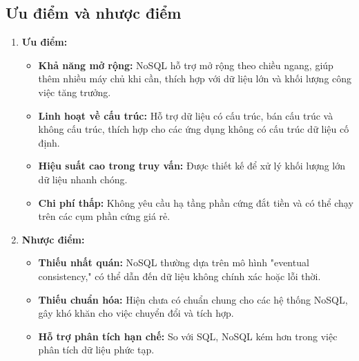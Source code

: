 \subsection{Ưu điểm và nhược điểm}
\begin{enumerate}
    \item [] \textbf{Ưu điểm:}
    \begin{itemize}[left=0.2cm]
    \item[-]\textbf{Khả năng mở rộng:} NoSQL hỗ trợ mở rộng theo chiều ngang, giúp thêm nhiều máy chủ khi cần, thích hợp với dữ liệu lớn và khối lượng công việc tăng trưởng.
    
    \item[-]\textbf{Linh hoạt về cấu trúc:} Hỗ trợ dữ liệu có cấu trúc, bán cấu trúc và không cấu trúc, thích hợp cho các ứng dụng không có cấu trúc dữ liệu cố định.
    
    \item[-]\textbf{Hiệu suất cao trong truy vấn:} Được thiết kế để xử lý khối lượng lớn dữ liệu nhanh chóng.
    
    \item[-]\textbf{Chi phí thấp:} Không yêu cầu hạ tầng phần cứng đắt tiền và có thể chạy trên các cụm phần cứng giá rẻ.
    \end{itemize}
    \newpage
    \item [] \textbf{Nhược điểm:}
    \begin{itemize}[left=0.2cm]
    \item[-]\textbf{Thiếu nhất quán:} NoSQL thường dựa trên mô hình "eventual \\consistency," có thể dẫn đến dữ liệu không chính xác hoặc lỗi thời.
    
    \item[-]\textbf{Thiếu chuẩn hóa:} Hiện chưa có chuẩn chung cho các hệ thống NoSQL, gây khó khăn cho việc chuyển đổi và tích hợp.
    
    \item[-]\textbf{Hỗ trợ phân tích hạn chế:} So với SQL, NoSQL kém hơn trong việc phân tích dữ liệu phức tạp.
    
    \end{itemize}
\end{enumerate}

